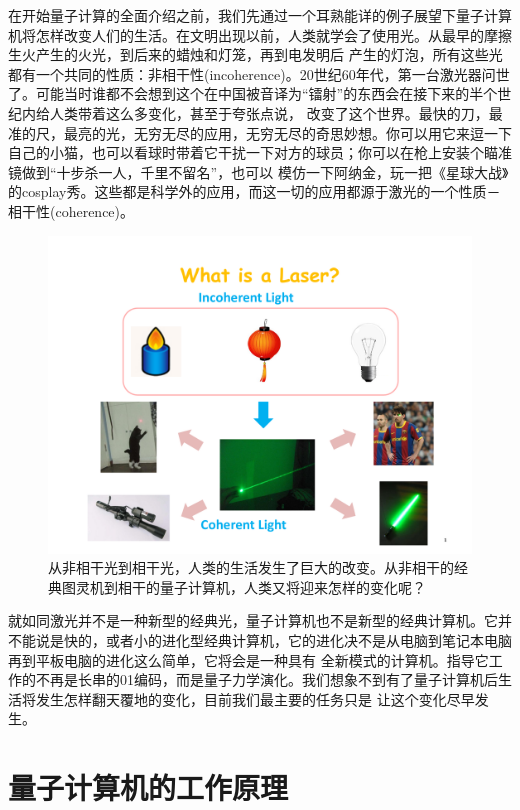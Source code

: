 在开始量子计算的全面介绍之前，我们先通过一个耳熟能详的例子展望下量子计算机将怎样改变人们的生活。在文明出现以前，人类就学会了使用光。从最早的摩擦生火产生的火光，到后来的蜡烛和灯笼，再到电发明后
产生的灯泡，所有这些光都有一个共同的性质：非相干性(incoherence)。20世纪60年代，第一台激光器问世了。可能当时谁都不会想到这个在中国被音译为“镭射”的东西会在接下来的半个世纪内给人类带着这么多变化，甚至于夸张点说，
改变了这个世界。最快的刀，最准的尺，最亮的光，无穷无尽的应用，无穷无尽的奇思妙想。你可以用它来逗一下自己的小猫，也可以看球时带着它干扰一下对方的球员；你可以在枪上安装个瞄准镜做到“十步杀一人，千里不留名”，也可以
模仿一下阿纳金，玩一把《星球大战》的cosplay秀。这些都是科学外的应用，而这一切的应用都源于激光的一个性质－相干性(coherence)。

        \begin{figure}[htbp]
            \begin{center}
              \includegraphics[width= 0.8\columnwidth]{figures/laser.pdf}
              \caption{从非相干光到相干光，人类的生活发生了巨大的改变。从非相干的经典图灵机到相干的量子计算机，人类又将迎来怎样的变化呢？
              }
              \label{laser}
            \end{center}
        \end{figure}

        就如同激光并不是一种新型的经典光，量子计算机也不是新型的经典计算机。它并不能说是快的，或者小的进化型经典计算机，它的进化决不是从电脑到笔记本电脑再到平板电脑的进化这么简单，它将会是一种具有
        全新模式的计算机。指导它工作的不再是长串的01编码，而是量子力学演化。我们想象不到有了量子计算机后生活将发生怎样翻天覆地的变化，目前我们最主要的任务只是
        让这个变化尽早发生。

    \section{量子计算机的工作原理}

